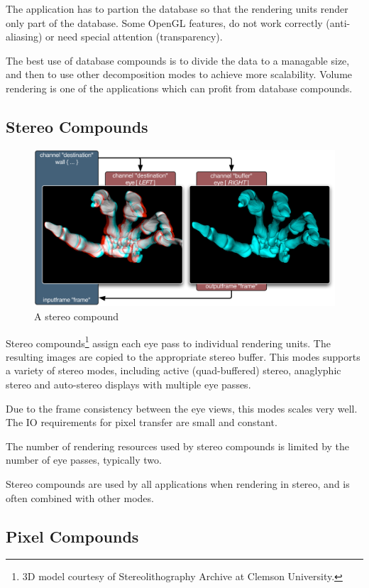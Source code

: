 \documentclass[10pt,a4]{scrartcl}
\begin{document}
The application has to partion the database so that the rendering units
render only part of the database. Some OpenGL features, do not work
correctly (anti-aliasing) or need special attention (transparency).

The best use of database compounds is to divide the data to a managable
size, and then to use other decomposition modes to achieve more
scalability. Volume rendering is one of the applications which can
profit from database compounds.


\subsection{Stereo Compounds}

\begin{figure}
  \includegraphics[width=.618\textwidth]{images/EYE.pdf}
  {\caption{\small A stereo compound}}
\end{figure}
Stereo compounds\footnote{3D model courtesy of Stereolithography Archive
  at Clemson University.} assign each eye pass to individual rendering
units. The resulting images are copied to the appropriate stereo
buffer. This modes supports a variety of stereo modes, including active
(quad-buffered) stereo, anaglyphic stereo and auto-stereo displays with
multiple eye passes.

Due to the frame consistency between the eye views, this modes scales
very well. The IO requirements for pixel transfer are small and
constant.

The number of rendering resources used by stereo compounds is limited by
the number of eye passes, typically two. 

Stereo compounds are used by all applications when rendering in stereo,
and is often combined with other modes.


\subsection{Pixel Compounds}
\end{document}
